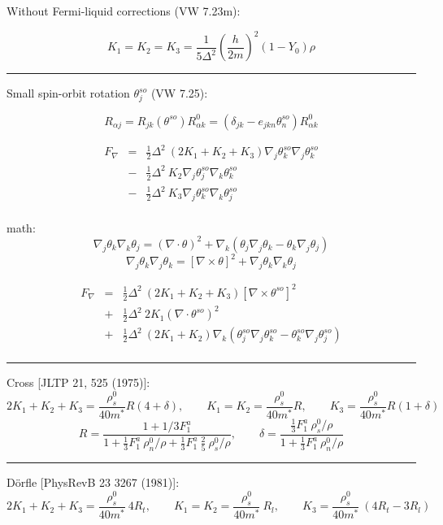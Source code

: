 \documentclass[a4paper]{article}
\begin{document}
Without Fermi-liquid corrections (VW 7.23m):

$$
K_1=K_2=K_3 = \frac{1}{5\Delta^2} \left(\frac{h}{2m}\right)^2 (1-Y_0)\rho
$$

\eject

\hrule
\medskip

Small spin-orbit rotation $\theta^{so}_j$ (VW 7.25):

$$
R_{\alpha j} = R_{jk}(\theta^{so}) R^0_{\alpha k} =
(\delta_{jk} - e_{jkn}\theta^{so}_n) R^0_{\alpha k}
$$

\begin{eqnarray*}
F_\nabla
&=& \frac12 \Delta^2\ (2 K_1 + K_2 + K_3)
\nabla_j\theta^{so}_k \nabla_j\theta^{so}_k\\
&-& \frac12 \Delta^2\ K_2
\nabla_j\theta^{so}_j \nabla_k\theta^{so}_k\\
&-& \frac12 \Delta^2\ K_3
\nabla_j\theta^{so}_k \nabla_k\theta^{so}_j\\
\end{eqnarray*}

math:
$$
\nabla_j \theta_k \nabla_k \theta_j = (\nabla \cdot \theta)^2 +
\nabla_k(\theta_j \nabla_j\theta_k - \theta_k \nabla_j\theta_j)
$$
$$
 \nabla_j \theta_k \nabla_j \theta_k = [\nabla \times \theta]^2 + \nabla_j \theta_k \nabla_k \theta_j
$$

\begin{eqnarray*}
F_\nabla
&=& \frac12 \Delta^2\ (2 K_1 + K_2 + K_3)
[\nabla \times \theta^{so}]^2\\
&+& \frac12 \Delta^2\  2K_1
(\nabla \cdot \theta^{so})^2\\
&+& \frac12 \Delta^2\ (2 K_1+K_2)
\nabla_k(\theta^{so}_j \nabla_j\theta^{so}_k - \theta^{so}_k \nabla_j\theta^{so}_j)\\
\end{eqnarray*}

\hrule
\medskip

Cross [JLTP 21, 525 (1975)]:
$$
2 K_1 + K_2 + K_3 = \frac{\rho_s^0}{40m^*} R(4+\delta),
\qquad
K_1 = K_2 = \frac{\rho_s^0}{40m^*} R,
\qquad
K_3 = \frac{\rho_s^0}{40m^*} R (1+\delta)
$$
$$
R = \frac{1+1/3 F^a_1}{1 + \frac13 F^a_1\ \rho_n^0/\rho + \frac13 F^a_1\ \frac25\ \rho_s^0/\rho},
\qquad
\delta =  \frac{\frac13 F^a_1\ \rho_s^0/\rho}{1+ \frac13 F^a_1\ \rho_n^0/\rho}
$$

\hrule
\medskip

D\"orfle [PhysRevB 23 3267 (1981)]:
$$
2 K_1 + K_2 + K_3 = \frac{\rho_s^0}{40m^*}\ 4R_t,
\qquad
K_1 = K_2 = \frac{\rho_s^0}{40m^*}\ R_l,
\qquad
K_3 = \frac{\rho_s^0}{40m^*}\ (4R_t - 3R_l)
$$
\end{document}
